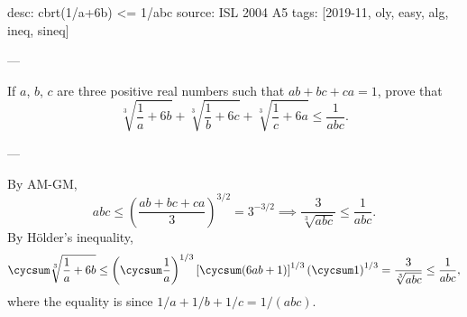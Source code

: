 desc: cbrt(1/a+6b) <= 1/abc
source: ISL 2004 A5
tags: [2019-11, oly, easy, alg, ineq, sineq]

---

If $a$, $b$, $c$ are three positive real numbers such that $ab+bc+ca=1$, prove that \[\sqrt[3]{\frac1a+6b}+\sqrt[3]{\frac1b+6c}+\sqrt[3]{\frac1c+6a}\le\frac1{abc}.\]

---

By AM-GM, \[abc\le\left(\frac{ab+bc+ca}3\right)^{3/2}=3^{-3/2}\implies\frac3{\sqrt[3]{abc}}\le\frac1{abc}.\]
By H\"older's inequality, \[\cycsum\sqrt[3]{\frac1a+6b}\le\left(\cycsum\frac1a\right)^{1/3}\left[\cycsum(6ab+1)\right]^{1/3}\left(\cycsum1\right)^{1/3}=\frac3{\sqrt[3]{abc}}\le\frac1{abc},\]
where the equality is since $1/a+1/b+1/c=1/(abc)$.

